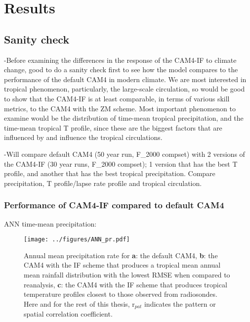 \documentclass[letterpaper,12pt,titlepage,oneside,final]{book}
\begin{document}
\chapter{Results}
\section{Sanity check}
-Before examining the differences in the response of the CAM4-IF to climate change, good to do a sanity check first to see how the model compares to the performance of the default CAM4 in modern climate. We are most interested in tropical phenomenon, particularly, the large-scale circulation, so would be good to show that the CAM4-IF is at least comparable, in terms of various skill metrics, to the CAM4 with the ZM scheme. Most important phenomenon to examine would be the distribution of time-mean tropical precipitation, and the time-mean tropical T profile, since these are the biggest factors that are influenced by and influence the tropical circulations.

-Will compare default CAM4 (50 year run, F\_2000 compset) with 2 versions of the CAM4-IF (30 year runs, F\_2000 compset); 1 version that has the best T profile, and another that has the best tropical precipitation. Compare precipitation, T profile/lapse rate profile and tropical circulation.

\subsection{Performance of CAM4-IF compared to default CAM4}
ANN time-mean precipitation:
\begin{figure}[H]
\centering
\noindent\texttt{[image: ../figures/ANN\_pr.pdf]}\hfill
\caption{Annual mean precipitation rate for \textbf{a}: the default CAM4, \textbf{b}: the CAM4 with the IF scheme that produces a tropical mean annual mean rainfall distribution with the lowest RMSE when compared to reanalysis, \textbf{c}: the CAM4 with the IF scheme that produces tropical temperature profiles closest to those observed from radiosondes. Here and for the rest of this thesis, r$_{pat}$ indicates the pattern or spatial correlation coefficient.}
\end{figure}
\newpage
\end{document}

